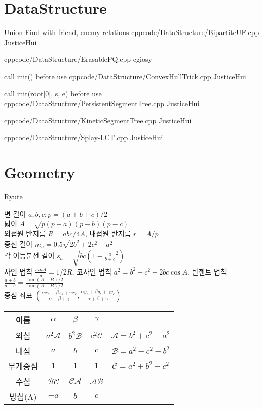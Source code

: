 \documentclass[landscape, 8pt, a4paper, oneside]{extarticle} %
\begin{document}
\begin{multicols*}{3}

\maketitlepage

\pagebreak 

\section{DataStructure}

{Union-Find with friend, enemy relations}{}
{cpp}{code/DataStructure/BipartiteUF.cpp}
{JusticeHui}

{}{}
{cpp}{code/DataStructure/ErasablePQ.cpp}
{cgiosy}

{call init() before use}{}
{cpp}{code/DataStructure/ConvexHullTrick.cpp}
{JusticeHui}

{call init(root[0], s, e) before use}{}
{cpp}{code/DataStructure/PersistentSegmentTree.cpp}
{JusticeHui}

{}{}
{cpp}{code/DataStructure/KineticSegmentTree.cpp}
{JusticeHui}

{}{}
{cpp}{code/DataStructure/Splay-LCT.cpp}
{JusticeHui}

\section{Geometry}

{}{}{}{}{Ryute}

변 길이 $a, b, c; p = (a+b+c)/2$ \\
넓이 $A = \sqrt{p(p-a)(p-b)(p-c)}$ \\
외접원 반지름 $R = abc/4A$, 내접원 반지름 $r = A/p$ \\
중선 길이 $m_a = 0.5\sqrt{2b^2 + 2c^2 - a^2}$ \\
각 이등분선 길이 $s_a = \sqrt{bc(1-\frac{a}{b+c}^2)}$ \\
사인 법칙 $\frac{sin A}{a} = 1/2R$, 코사인 법칙 $a^2 = b^2 + c^2 - 2bc\cos A$, 탄젠트 법칙 $\frac{a+b}{a-b} = \frac{\tan (A+B)/2}{\tan (A-B)/2}$ \\
중심 좌표 $(\frac{\alpha x_a + \beta x_b + \gamma x_c}{\alpha+\beta+\gamma}, \frac{\alpha y_a + \beta y_b + \gamma y_c}{\alpha+\beta+\gamma})$ \\

\begin{tabular}{|c|c|c|c|c|}
    이름 & $\alpha$ & $\beta$ & $\gamma$ & \\ \hline
    외심 & $a^2\mathcal{A}$ & $b^2\mathcal{B}$ & $c^2\mathcal{C}$ & $\mathcal{A}=b^2+c^2-a^2$ \\
    내심 & $a$ & $b$ & $c$ & $\mathcal{B} = a^2 + c^2 - b^2$ \\
    무게중심 & $1$ & $1$ & $1$ & $\mathcal{C} = a^2 + b^2 - c^2$ \\
    수심 & $\mathcal{BC}$ & $\mathcal{CA}$ & $\mathcal{AB}$ & \\
    방심(A) & $-a$ & $b$ & $c$ & 
\end{tabular}


\end{multicols*}
\end{document}
